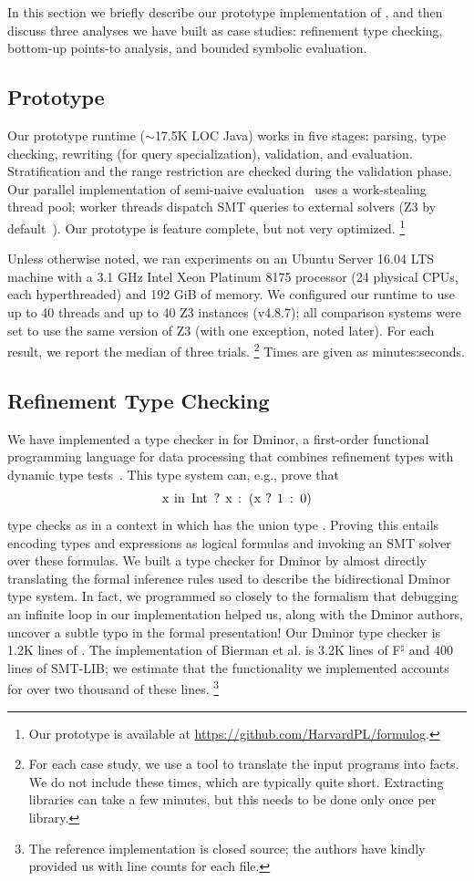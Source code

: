 \documentclass[acmsmall,screen,nonacm]{acmart}
\theoremstyle{definition}
\begin{document}
In this section we briefly describe our prototype implementation of \Name, and
then discuss three analyses we have built as case studies: refinement type
checking, bottom-up points-to analysis, and bounded symbolic evaluation.

\subsection{Prototype}\label{sec:prototype}

Our prototype runtime ($\sim$17.5K LOC Java) works in five stages: parsing,
type checking, rewriting (for query specialization), validation, and evaluation.
Stratification and the range restriction are checked during the validation
phase.
Our parallel implementation of semi-naive evaluation~\citep{bancilhon1986naive}
uses a work-stealing thread pool; worker threads dispatch SMT queries to external solvers (Z3 by default~\citep{z3}).
Our prototype is feature complete, but not very optimized.%
\footnote{Our prototype is available at
\url{https://github.com/HarvardPL/formulog}.}

Unless otherwise noted, we ran experiments on an Ubuntu Server 16.04 LTS
machine with a 3.1 GHz Intel Xeon Platinum 8175 processor (24 physical CPUs,
each hyperthreaded) and 192 GiB of memory.
We configured our \Name runtime to use up to 40 threads and up to 40 Z3
instances (v4.8.7); all comparison systems were set to use the same version of
Z3 (with one exception, noted later).
For each result, we report the median of three trials.%
\footnote{For each case study, we use a tool to translate the input programs
into \Name facts.  We do not include these times, which are typically quite
short. Extracting libraries can take a few minutes, but this needs to be done
only once per library.}
Times are given as minutes:seconds.

\subsection{Refinement Type Checking}\label{sec:dminor}

We have implemented a type checker in \Name for Dminor, a first-order
functional programming language for data processing that combines refinement
types with dynamic type tests~\citep{dminor}.
This type system can, e.g., prove that
$$\ic{x in Int ? x : (x ? 1 : 0)}$$
type checks as  in a context in which  has the union type
.
Proving this entails encoding types and expressions as logical formulas and
invoking an SMT solver over these formulas.
We built a type checker for Dminor by almost directly translating the formal
inference rules used to describe the bidirectional Dminor type system.
In fact, we programmed so closely to the formalism that debugging an infinite
loop in our implementation helped us, along with the Dminor authors, uncover a
subtle typo in the formal presentation!
Our Dminor type checker is 1.2K lines of \Name.
The implementation of Bierman et al. is 3.2K lines of F$^\sharp$ and 400 lines
of SMT-LIB; we estimate that the functionality we implemented accounts for over
two thousand of these lines.%
\footnote{The reference implementation is closed source; the authors have
kindly provided us with line counts for each file.}
\end{document}
